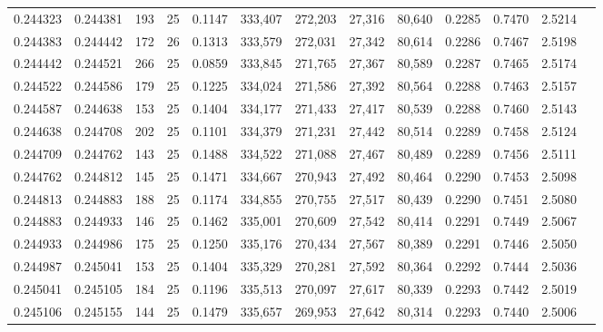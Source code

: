 \begin{tabular}{rrrrrrrrrrrrr}
0.244323 & 0.244381 &   193 &  25 &                                     0.1147 & 333,407 & 272,203 &  27,316 &  80,640 & 0.2285 & 0.7470 & 2.5214 \\
0.244383 & 0.244442 &   172 &  26 &                                     0.1313 & 333,579 & 272,031 &  27,342 &  80,614 & 0.2286 & 0.7467 & 2.5198 \\
0.244442 & 0.244521 &   266 &  25 &                                     0.0859 & 333,845 & 271,765 &  27,367 &  80,589 & 0.2287 & 0.7465 & 2.5174 \\
0.244522 & 0.244586 &   179 &  25 &                                     0.1225 & 334,024 & 271,586 &  27,392 &  80,564 & 0.2288 & 0.7463 & 2.5157 \\
0.244587 & 0.244638 &   153 &  25 &                                     0.1404 & 334,177 & 271,433 &  27,417 &  80,539 & 0.2288 & 0.7460 & 2.5143 \\
0.244638 & 0.244708 &   202 &  25 &                                     0.1101 & 334,379 & 271,231 &  27,442 &  80,514 & 0.2289 & 0.7458 & 2.5124 \\
0.244709 & 0.244762 &   143 &  25 &                                     0.1488 & 334,522 & 271,088 &  27,467 &  80,489 & 0.2289 & 0.7456 & 2.5111 \\
0.244762 & 0.244812 &   145 &  25 &                                     0.1471 & 334,667 & 270,943 &  27,492 &  80,464 & 0.2290 & 0.7453 & 2.5098 \\
0.244813 & 0.244883 &   188 &  25 &                                     0.1174 & 334,855 & 270,755 &  27,517 &  80,439 & 0.2290 & 0.7451 & 2.5080 \\
0.244883 & 0.244933 &   146 &  25 &                                     0.1462 & 335,001 & 270,609 &  27,542 &  80,414 & 0.2291 & 0.7449 & 2.5067 \\
0.244933 & 0.244986 &   175 &  25 &                                     0.1250 & 335,176 & 270,434 &  27,567 &  80,389 & 0.2291 & 0.7446 & 2.5050 \\
0.244987 & 0.245041 &   153 &  25 &                                     0.1404 & 335,329 & 270,281 &  27,592 &  80,364 & 0.2292 & 0.7444 & 2.5036 \\
0.245041 & 0.245105 &   184 &  25 &                                     0.1196 & 335,513 & 270,097 &  27,617 &  80,339 & 0.2293 & 0.7442 & 2.5019 \\
0.245106 & 0.245155 &   144 &  25 &                                     0.1479 & 335,657 & 269,953 &  27,642 &  80,314 & 0.2293 & 0.7440 & 2.5006 \\

\end{tabular}

